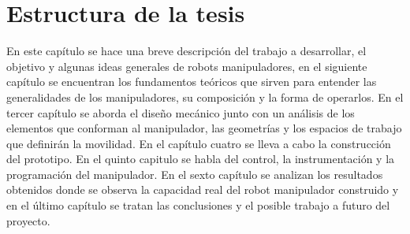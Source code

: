 
\section{Estructura de la tesis}

En este capítulo se hace una breve descripción del trabajo a desarrollar, el objetivo y algunas ideas generales de robots manipuladores, en el siguiente capítulo se encuentran los fundamentos teóricos que sirven para entender las generalidades de los manipuladores, su composición y la forma de operarlos. En el tercer capítulo se aborda el diseño mecánico junto con un análisis de los elementos que conforman al manipulador, las geometrías y los espacios de trabajo que definirán la movilidad. En el capítulo cuatro se lleva a cabo la construcción del prototipo. En el quinto capitulo se habla del control, la instrumentación y la programación del manipulador. En el sexto capítulo se analizan los resultados obtenidos donde se observa la capacidad real del robot manipulador construido y en el último capítulo se tratan las conclusiones y el posible trabajo a futuro del proyecto.